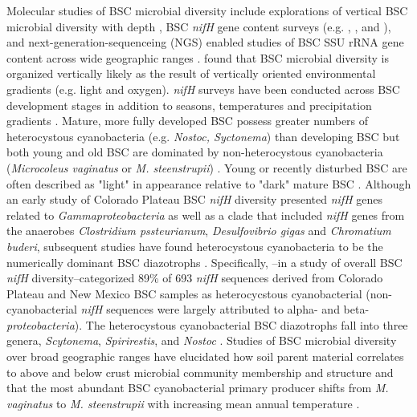 Molecular studies of BSC microbial diversity include explorations of vertical BSC microbial diversity with depth \cite{Garcia_Pichel_2003}, BSC \textit{nifH} gene content surveys (e.g. \citet{14766579}, \citet{Yeager_2012}, \citet{Yeager} and \citet{Steppe_1996}), and next-generation-sequenceing (NGS) enabled studies of BSC SSU rRNA gene content across wide geographic ranges \cite{Garcia_Pichel_2013, Steven_2013}. \citet{Garcia_Pichel_2003} found that BSC microbial diversity is organized vertically likely as the result of vertically oriented environmental gradients (e.g. light and oxygen). \textit{nifH} surveys have been conducted across BSC development stages \cite{14766579} in addition to seasons, temperatures and precipitation gradients \cite{Yeager_2012}. Mature, more fully developed BSC possess greater numbers of heterocystous cyanobacteria (e.g. \textit{Nostoc, Syctonema}) than developing BSC but both young and old BSC are dominated by non-heterocystous cyanobacteria (\textit{Microcoleus vaginatus} or \textit{M. steenstrupii}) \cite{14766579, Garcia_Pichel_2013}. Young or recently disturbed BSC are often described as "light" in appearance relative to "dark" mature BSC \cite{Belnap_2002}.  Although an early study of Colorado Plateau BSC \textit{nifH} diversity presented \textit{nifH} genes related to \textit{Gammaproteobacteria} as well as a clade that included \textit{nifH} genes from the anaerobes \textit{Clostridium pssteurianum}, \textit{Desulfovibrio gigas} and \textit{Chromatium buderi}, subsequent studies have found heterocystous cyanobacteria to be the numerically dominant BSC diazotrophs \cite{Yeager, 14766579, Yeager_2012}. Specifically, \citet{Yeager}--in a study of overall BSC \textit{nifH} diversity--categorized 89\% of 693 \textit{nifH} sequences derived from Colorado Plateau and New Mexico BSC samples as heterocycstous cyanobacterial (non-cyanobacterial \textit{nifH} sequences were largely attributed to alpha- and beta- \textit{proteobacteria}). The heterocystous cyanobacterial BSC diazotrophs fall into three genera, \textit{Scytonema}, \textit{Spirirestis}, and \textit{Nostoc} \cite{Yeager, Yeager_2012}. Studies of BSC microbial diversity over broad geographic ranges have elucidated how soil parent material correlates to above and below crust microbial community membership and structure \cite{Steven_2013} and that the most abundant BSC cyanobacterial primary producer shifts from \textit{M. vaginatus} to \textit{M. steenstrupii} with increasing mean annual temperature \cite{Garcia_Pichel_2013}.

